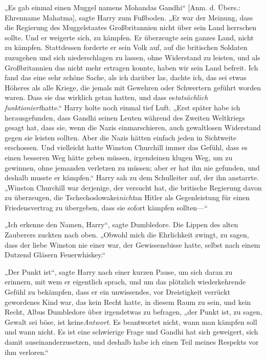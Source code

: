 {„Es gab einmal einen Muggel namens Mohandas Gandhi“ {[}Anm. d. Übers.: Ehrenname Mahatma{]}, sagte Harry zum Fußboden. „Er war der Meinung, dass die Regierung des Muggelstaates Großbritannien nicht über sein Land herrschen sollte. Und er weigerte sich, zu kämpfen. Er überzeugte sein ganzes Land, nicht zu kämpfen. Stattdessen forderte er sein Volk auf, auf die britischen Soldaten zuzugehen und sich niederschlagen zu lassen, ohne Widerstand zu leisten, und als Großbritannien das nicht mehr ertragen konnte, haben wir sein Land befreit. Ich fand das eine sehr schöne Sache, als ich darüber las, dachte ich, das sei etwas Höheres als alle Kriege, die jemals mit Gewehren oder Schwertern geführt worden waren. Dass sie das wirklich getan hatten, und dass es\emph{tatsächlich funktioniert}hatte.“ Harry holte noch einmal tief Luft. „Erst später habe ich herausgefunden, dass Gandhi seinen Leuten während des Zweiten Weltkriegs gesagt hat, dass sie, wenn die Nazis einmarschieren, auch gewaltlosen Widerstand gegen sie leisten sollten. Aber die Nazis hätten einfach jeden in Sichtweite erschossen. Und vielleicht hatte Winston Churchill immer das Gefühl, dass es einen besseren Weg hätte geben müssen, irgendeinen klugen Weg, um zu gewinnen, ohne jemanden verletzen zu müssen; aber er hat ihn nie gefunden, und deshalb musste er kämpfen.“ Harry sah zu dem Schulleiter auf, der ihn anstarrte. „Winston Churchill war derjenige, der versucht hat, die britische Regierung davon zu überzeugen, die Tschechoslowakei\emph{nicht}an Hitler als Gegenleistung für einen Friedensvertrag zu übergeben, dass sie sofort kämpfen sollten—“

„Ich erkenne den Namen, Harry“, sagte Dumbledore. Die Lippen des alten Zauberers zuckten nach oben. „Obwohl mich die Ehrlichkeit zwingt, zu sagen, dass der liebe Winston nie einer war, der Gewissensbisse hatte, selbst nach einem Dutzend Gläsern Feuerwhiskey.“

„Der Punkt ist“, sagte Harry nach einer kurzen Pause, um sich daran zu erinnern, mit wem er eigentlich sprach, und um das plötzlich wiederkehrende Gefühl zu bekämpfen, dass er ein unwissendes, vor Dreistigkeit verrückt gewordenes Kind war, das kein Recht hatte, in diesem Raum zu sein, und kein Recht, Albus Dumbledore über irgendetwas zu befragen, „der Punkt ist, zu sagen, Gewalt sei böse, ist keine\emph{Antwort}. Es beantwortet nicht, wann man kämpfen soll und wann nicht. Es ist eine schwierige Frage und Gandhi hat sich geweigert, sich damit auseinanderzusetzen, und deshalb habe ich einen Teil meines Respekts vor ihm verloren.“

}
